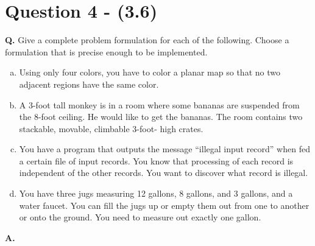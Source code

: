 \documentclass[12pt]{amsart}
\begin{document}
\section*{Question 4 - (3.6)}
\textbf{Q.}  Give a complete problem formulation for each of the following. Choose a formulation that is precise enough to be implemented. 

\begin{enumerate}[a)]
  \item Using only four colors, you have to color a planar map so that no two adjacent regions have the same color.

    \item A 3-foot tall monkey is in a room where some bananas are suspended from the 8-foot ceiling. He would like to get the bananas. The room contains two stackable, movable, climbable 3-foot- high crates.

       \item  You have a program that outputs the message “illegal input record” when fed a certain file of input records. You know that processing of each record is independent of the other records. You want to discover what record is illegal.
       
        \item You have three jugs measuring 12 gallons, 8 gallons, and 3 gallons, and a water faucet. You can fill the jugs up or empty them out from one to another or onto the ground. You need to measure out exactly one gallon.
\end{enumerate} \hfill \break

\textbf{A.}
\end{document}
